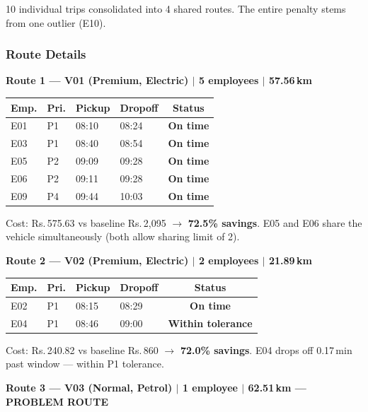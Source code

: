 \documentclass[11pt,a4paper]{article}
\newcommand{\rupee}{Rs.}
\newcommand{\statusok}{\textcolor{velgreen}{\textbf{On time}}}
\newcommand{\statustol}{\textcolor{velorange}{\textbf{Within tolerance}}}
\newcommand{\saving}[1]{\textcolor{velgreen}{\textbf{#1}}}
\begin{document}
10 individual trips consolidated into 4 shared routes. The entire penalty stems from one outlier (E10).

\subsubsection{Route Details}

\textbf{Route 1 --- V01 (Premium, Electric) $|$ 5 employees $|$ 57.56\,km}

\begin{table}[H]
\centering
\begin{tabular}{llllc}
\toprule
\textbf{Emp.} & \textbf{Pri.} & \textbf{Pickup} & \textbf{Dropoff} & \textbf{Status} \\
\midrule
\rowcolor{rowalt}
E01 & P1 & 08:10 & 08:24 & \statusok \\
E03 & P1 & 08:40 & 08:54 & \statusok \\
\rowcolor{rowalt}
E05 & P2 & 09:09 & 09:28 & \statusok \\
E06 & P2 & 09:11 & 09:28 & \statusok \\
\rowcolor{rowalt}
E09 & P4 & 09:44 & 10:03 & \statusok \\
\bottomrule
\end{tabular}
\end{table}
Cost: \rupee\,575.63 vs baseline \rupee\,2,095 $\rightarrow$ \saving{72.5\% savings}. E05 and E06 share the vehicle simultaneously (both allow sharing limit of 2).

\vspace{6pt}
\textbf{Route 2 --- V02 (Premium, Electric) $|$ 2 employees $|$ 21.89\,km}

\begin{table}[H]
\centering
\begin{tabular}{llllc}
\toprule
\textbf{Emp.} & \textbf{Pri.} & \textbf{Pickup} & \textbf{Dropoff} & \textbf{Status} \\
\midrule
\rowcolor{rowalt}
E02 & P1 & 08:15 & 08:29 & \statusok \\
E04 & P1 & 08:46 & 09:00 & \statustol \\
\bottomrule
\end{tabular}
\end{table}
Cost: \rupee\,240.82 vs baseline \rupee\,860 $\rightarrow$ \saving{72.0\% savings}. E04 drops off 0.17\,min past window --- within P1 tolerance.

\vspace{6pt}
\textbf{Route 3 --- V03 (Normal, Petrol) $|$ 1 employee $|$ 62.51\,km \textcolor{velred}{--- PROBLEM ROUTE}}
\end{document}
